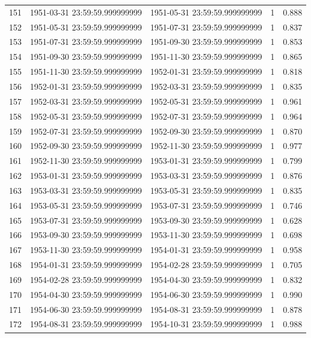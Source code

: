 \begin{table}
\begin{tabular}{lcccc}
151 & 1951-03-31 23:59:59.999999999 & 1951-05-31 23:59:59.999999999 & 1 & 0.888 \\
152 & 1951-05-31 23:59:59.999999999 & 1951-07-31 23:59:59.999999999 & 1 & 0.837 \\
153 & 1951-07-31 23:59:59.999999999 & 1951-09-30 23:59:59.999999999 & 1 & 0.853 \\
154 & 1951-09-30 23:59:59.999999999 & 1951-11-30 23:59:59.999999999 & 1 & 0.865 \\
155 & 1951-11-30 23:59:59.999999999 & 1952-01-31 23:59:59.999999999 & 1 & 0.818 \\
156 & 1952-01-31 23:59:59.999999999 & 1952-03-31 23:59:59.999999999 & 1 & 0.835 \\
157 & 1952-03-31 23:59:59.999999999 & 1952-05-31 23:59:59.999999999 & 1 & 0.961 \\
158 & 1952-05-31 23:59:59.999999999 & 1952-07-31 23:59:59.999999999 & 1 & 0.964 \\
159 & 1952-07-31 23:59:59.999999999 & 1952-09-30 23:59:59.999999999 & 1 & 0.870 \\
160 & 1952-09-30 23:59:59.999999999 & 1952-11-30 23:59:59.999999999 & 1 & 0.977 \\
161 & 1952-11-30 23:59:59.999999999 & 1953-01-31 23:59:59.999999999 & 1 & 0.799 \\
162 & 1953-01-31 23:59:59.999999999 & 1953-03-31 23:59:59.999999999 & 1 & 0.876 \\
163 & 1953-03-31 23:59:59.999999999 & 1953-05-31 23:59:59.999999999 & 1 & 0.835 \\
164 & 1953-05-31 23:59:59.999999999 & 1953-07-31 23:59:59.999999999 & 1 & 0.746 \\
165 & 1953-07-31 23:59:59.999999999 & 1953-09-30 23:59:59.999999999 & 1 & 0.628 \\
166 & 1953-09-30 23:59:59.999999999 & 1953-11-30 23:59:59.999999999 & 1 & 0.698 \\
167 & 1953-11-30 23:59:59.999999999 & 1954-01-31 23:59:59.999999999 & 1 & 0.958 \\
168 & 1954-01-31 23:59:59.999999999 & 1954-02-28 23:59:59.999999999 & 1 & 0.705 \\
169 & 1954-02-28 23:59:59.999999999 & 1954-04-30 23:59:59.999999999 & 1 & 0.832 \\
170 & 1954-04-30 23:59:59.999999999 & 1954-06-30 23:59:59.999999999 & 1 & 0.990 \\
171 & 1954-06-30 23:59:59.999999999 & 1954-08-31 23:59:59.999999999 & 1 & 0.878 \\
172 & 1954-08-31 23:59:59.999999999 & 1954-10-31 23:59:59.999999999 & 1 & 0.988 \\

\end{tabular}
\end{table}
